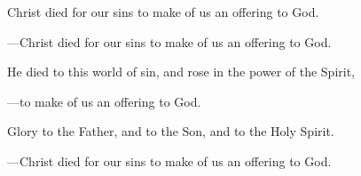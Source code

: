 \responsory
\begin{hangpar}

Christ died for our sins to make of us an offering to God.

{\color{red}---\thinspace}Christ died for our sins to make of us an offering to God.

\medskip He died to this world of sin, and rose in the power of the Spirit,

{\color{red}---\thinspace}to make of us an offering to God.

\medskip Glory to the Father, and to the Son, and to the Holy Spirit.

{\color{red}---\thinspace}Christ died for our sins to make of us an offering to God.
\end{hangpar}
